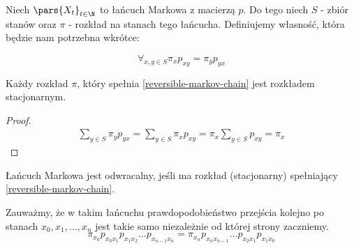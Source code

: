 \begin{definition} \label{reversible-markov-chain}
	Niech \(\pars{X_t}_{t \in \N}\) to łańcuch Markowa z macierzą \(p\).
	Do tego niech \(S\) - zbiór stanów oraz \(\pi\) - rozkład na stanach tego łańcucha.
	Definiujemy własność, która będzie nam potrzebna wkrótce:

	\[
		\forall_{x,y \in S}\pi_xp_{xy} = \pi_yp_{yx}
	\]
\end{definition}

\begin{lemma}
	Każdy rozkład \(\pi\), który spełnia \ref{reversible-markov-chain} jest rozkładem stacjonarnym.
\end{lemma}
\begin{proof}
	\begin{align*}
		\sum_{y \in S}\pi_yp_{yx} = \sum_{y \in S}\pi_xp_{xy} = \pi_x\sum_{y \in S}p_{xy} = \pi_x
	\end{align*}
\end{proof}

\begin{definition}
	Łańcuch Markowa jest odwracalny, jeśli ma rozkład (stacjonarny) spełniający \ref{reversible-markov-chain}.
\end{definition}

Zauważmy, że w takim łańcuchu prawdopodobieństwo przejścia kolejno po stanach \(x_0, x_1, \dots, x_n\) jest takie samo niezależnie od której strony zaczniemy.
\[
	\pi_{x_0}p_{x_0x_1}p_{x_1x_2}\dots p_{x_{n-1}x_n} = \pi_{x_n}p_{x_n x_{n-1}}\dots p_{x_2x_1}p_{x_1x_0}
\]